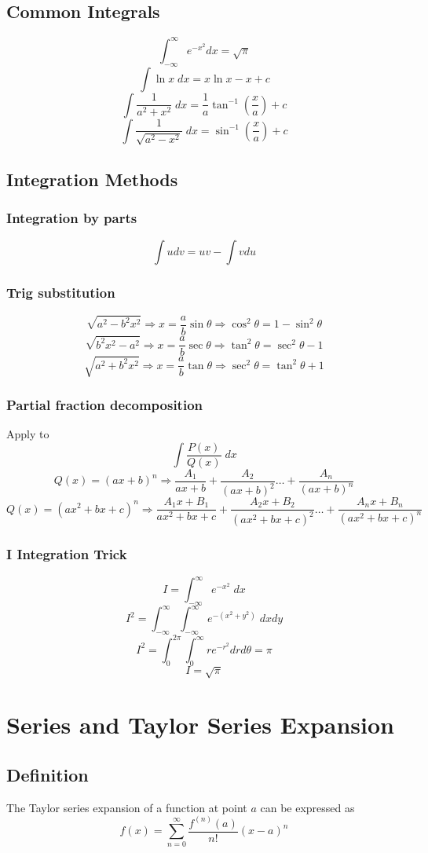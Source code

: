 \documentclass[12pt]{book}
\newcommand{\paren}[1]{\left( #1 \right)}
\begin{document}
\subsection{Common Integrals}
\[
\int_{-\infty}^{\infty} e^{-x^2} dx= \sqrt{\pi}
\]
\[
\int \ln{x} \;dx = x\ln{x} - x +c
\]
\[
\int \frac{1}{a^2 + x^2} \; dx = \frac{1}{a} \tan^{-1} {\paren{\frac{x}{a}}} + c
\]
\[
\int \frac{1}{\sqrt{a^2 -x^2}} \; dx = \sin ^{-1} \paren{\frac{x}{a}} +c
\]
\subsection{Integration Methods}
\subsubsection{Integration by parts}
\[
\int udv = uv - \int vdu
\]
\subsubsection{Trig substitution}
\[
\sqrt{a^2 - b^2x^2} \Rightarrow x = \frac{a}{b}\sin{\theta} \Rightarrow \cos^2 \theta = 1- \sin ^2 \theta
\]
\[
\sqrt{b^2x^2 - a^2} \Rightarrow x = \frac{a}{b}\sec{\theta} \Rightarrow \tan^2 \theta =  \sec ^2 \theta -1
\]
\[
\sqrt{a^2 + b^2x^2} \Rightarrow x = \frac{a}{b}\tan{\theta} \Rightarrow \sec^2 \theta =  \tan ^2 \theta +1
\]
\subsubsection{Partial fraction decomposition}
Apply to
\[
\int \frac{P(x)}{Q(x)} \; dx
\]
\[
Q(x) = \paren{ax+b}^n \Rightarrow \frac{A_1}{ax+b} + \frac{A_2}{\paren{ax+b}^2} \ldots +\frac{A_n}{\paren{ax+b}^n}
\]
\[
Q(x) = \paren{ax^2+bx+c}^n \Rightarrow \frac{A_1x+B_1}{ax^2+bx+c} + \frac{A_2x+B_2}{\paren{ax^2+bx+c}^2} \ldots +\frac{A_nx+B_n}{\paren{ax^2+bx+c}^n}
\]
\subsubsection{I Integration Trick}
\[
I=\int_{-\infty}^{\infty} e^{-x^2} \; dx
\]
\[
I^2 = \int_{-\infty}^{\infty}\int_{-\infty}^{\infty} e^{-\paren{x^2+y^2}} \; dxdy
\]
\[
I^2 = \int_{0}^{2\pi}\int_{0}^{\infty} re^{-r^2} drd\theta = \pi
\]
\[
I = \sqrt{\pi}
\]
\section{Series and Taylor Series Expansion}
\subsection{Definition}
The Taylor series expansion of a function at point $a$ can be expressed as 
\[
f(x) = \sum_{n=0}^{\infty} \frac{f^{(n)}(a)}{n!}(x-a)^n
\]
\end{document}
